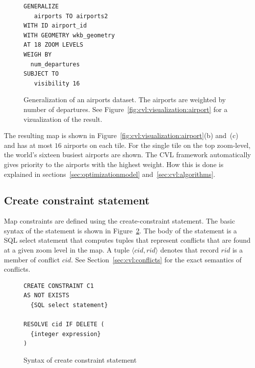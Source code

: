 \documentclass[11pt, oneside]{report}
\begin{document}
{\begin{figure}[ht]
\begin{center}
\begin{lstlisting}
GENERALIZE 
   airports TO airports2
WITH ID airport_id
WITH GEOMETRY wkb_geometry
AT 18 ZOOM LEVELS
WEIGH BY
  num_departures
SUBJECT TO 
   visibility 16 
\end{lstlisting}
\vspace*{-1ex}
\caption{Generalization of an airports dataset. The airports are weighted by number of departures. See Figure~\ref{fig:cvl:visualization:airport} for a vizualization of the result.}
\label{fig:cvl:example:airports}
\end{center}
\vspace*{-2ex}
\end{figure}



The resulting map is shown in Figure~\ref{fig:cvl:visualization:airport}(b) and~(c) and has at most $16$ airports on each tile. For the single tile on the top zoom-level, the world's sixteen busiest airports are shown. The CVL framework automatically gives priority to the airports with the highest weight. How this is done is explained in sections~\ref{sec:optimizationmodel} and~\ref{sec:cvl:algorithms}.

\subsection{Create constraint statement}
\label{sec:cvl:create:constraint:statement}

Map constraints are defined using the create-constraint statement.  The basic syntax of the statement is shown in Figure~\ref{fig:create:constraint:syntax}. The body of the statement is a SQL select statement that computes tuples that represent conflicts that are found at a given zoom level in the map. A tuple $\langle cid, rid\rangle$ denotes that record $rid$ is a member of conflict $cid$. See Section~\ref{sec:cvl:conflicts} for the exact semantics of conflicts.

\begin{figure}[ht]
\begin{center}
\begin{lstlisting}
CREATE CONSTRAINT C1
AS NOT EXISTS
  {SQL select statement}
  
RESOLVE cid IF DELETE (
  {integer expression}
)
\end{lstlisting}
\caption{Syntax of create constraint statement}
\label{fig:create:constraint:syntax}
\end{center}
\vspace*{-1ex}
\end{figure}

}
\end{document}
